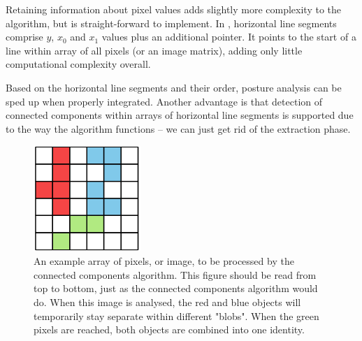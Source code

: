 \documentclass[9pt,lineno]{elife}
\newcommand{\TRex}{\protect\path{TRex}}
\begin{document}
\begin{appendixbox}
Retaining information about pixel values adds slightly more complexity to the algorithm, but is straight-forward to implement. In \TRex{}, horizontal line segments comprise $y$, $x_0$ and $x_1$ values plus an additional pointer. It points to the start of a line within array of all pixels (or an image matrix), adding only little computational complexity overall.

Based on the horizontal line segments and their order, posture analysis can be sped up when properly integrated. Another advantage is that detection of connected components within arrays of horizontal line segments is supported due to the way the algorithm functions -- we can just get rid of the extraction phase.

\end{appendixbox}

\begin{figure}[b]
    \centering
    \includegraphics[width=0.36\textwidth]{connected_component.pdf}
    \caption{An example array of pixels, or image, to be processed by the connected components algorithm. This figure should be read from top to bottom, just as the connected components algorithm would do. When this image is analysed, the red and blue objects will temporarily stay separate within different "blobs". When the green pixels are reached, both objects are combined into one identity.}
	\label{fig:connected_component}
\end{figure}
\end{document}
